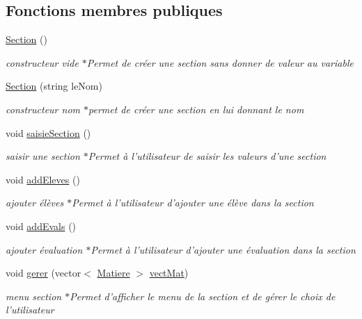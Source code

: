 \subsection*{Fonctions membres publiques}
\begin{DoxyCompactItemize}
\item 
\hyperlink{class_section_a77b88e06692841ba49559d22a25a09f9}{Section} ()
\begin{DoxyCompactList}\small\item\em constructeur vide $\ast$\-Permet de créer une section sans donner de valeur au variable \end{DoxyCompactList}\item 
\hyperlink{class_section_aee5cac3104ae14544153dccfdc442b72}{Section} (string le\-Nom)
\begin{DoxyCompactList}\small\item\em constructeur nom $\ast$permet de créer une section en lui donnant le nom \end{DoxyCompactList}\item 
void \hyperlink{class_section_a7f3e53b28e0afcbba1c21168af9015bc}{saisie\-Section} ()
\begin{DoxyCompactList}\small\item\em saisir une section $\ast$\-Permet à l'utilisateur de saisir les valeurs d'une section \end{DoxyCompactList}\item 
void \hyperlink{class_section_abf60dc588ce5704e8cd259453cbe9e91}{add\-Eleves} ()
\begin{DoxyCompactList}\small\item\em ajouter élèves $\ast$\-Permet à l'utilisateur d'ajouter une élève dans la section \end{DoxyCompactList}\item 
void \hyperlink{class_section_a2009ece57cde4881da48efc6696ed691}{add\-Evals} ()
\begin{DoxyCompactList}\small\item\em ajouter évaluation $\ast$\-Permet à l'utilisateur d'ajouter une évaluation dans la section \end{DoxyCompactList}\item 
void \hyperlink{class_section_a59158781444f53654b89fad68291791b}{gerer} (vector$<$ \hyperlink{class_matiere}{Matiere} $>$ \hyperlink{main_8cpp_ac04b2ba8d7488df23bc7f9122d15434d}{vect\-Mat})
\begin{DoxyCompactList}\small\item\em menu section $\ast$\-Permet d'afficher le menu de la section et de gérer le choix de l'utilisateur \end{DoxyCompactList}\item 

\end{DoxyCompactItemize}

